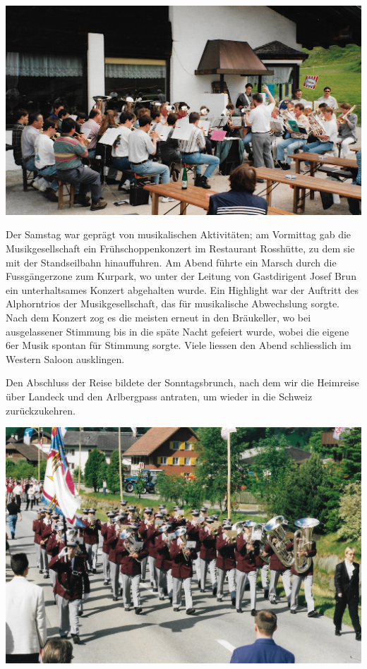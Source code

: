 \begin{history}
    \begin{MulticolFigure}
        \centering
        \includegraphics[width=0.93\linewidth]{./chap/1975-2000/1997/MGH-Ausflug-Seefeld-1997-1.jpg}
    \end{MulticolFigure}

    Der Samstag war geprägt von musikalischen Aktivitäten; am Vormittag gab die
    Musikgesellschaft ein Frühschoppenkonzert im Restaurant Rosshütte, zu dem
    sie mit der Standseilbahn hinauffuhren. Am Abend führte ein Marsch durch die
    Fussgängerzone zum Kurpark, wo unter der Leitung von Gastdirigent Josef Brun
    ein unterhaltsames Konzert abgehalten wurde. Ein Highlight war der Auftritt
    des Alphorntrios der Musikgesellschaft, das für musikalische Abwechslung
    sorgte. Nach dem Konzert zog es die meisten erneut in den Bräukeller, wo bei
    ausgelassener Stimmung bis in die späte Nacht gefeiert wurde, wobei die
    eigene 6er Musik spontan für Stimmung sorgte. Viele liessen den Abend
    schliesslich im Western Saloon ausklingen.


    Den Abschluss der Reise bildete der Sonntagsbrunch, nach dem wir die
    Heimreise über Landeck und den Arlbergpass antraten, um wieder in die
    Schweiz zurückzukehren.

    \begin{MulticolFigure}
        \centering
        \includegraphics[width=0.85\linewidth]{./chap/1975-2000/1998/MGH-Musiktag-Hergiswil-1998.jpg}
    \end{MulticolFigure}


\end{history}
